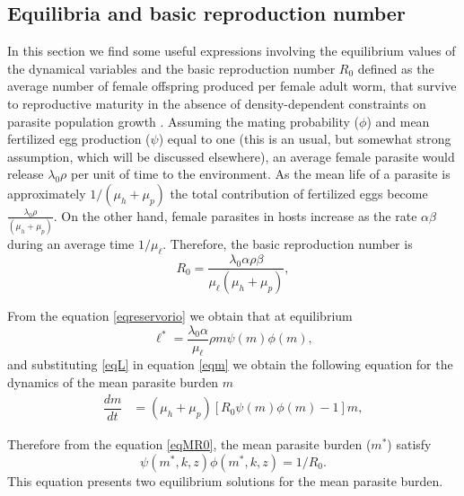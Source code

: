 \documentclass[eng]{MMSB-class-eng}
\begin{document}
{\subsection{Equilibria and basic reproduction number}



{\color{red}
In this section we find some useful expressions involving the equilibrium values of the dynamical variables and the basic reproduction number $R_0$ defined as 
the average number of female offspring produced per female adult worm, that survive to reproductive maturity in the
absence of density-dependent constraints on parasite population growth \citep{anderson1992infectious}. Assuming the mating probability ($\phi$) and mean fertilized egg production ($\psi$) equal to one (this is an usual, but somewhat strong assumption, which will be discussed elsewhere), an average female parasite would release $ \lambda_0  \rho$ per unit of time to the environment. As the mean life of a parasite is approximately $1/(\mu_h+\mu_p)$ the total contribution of fertilized eggs become $\frac{\lambda_0  \rho}{ (\mu_h + \mu_p)}$. On the other hand, female parasites in hosts increase as the rate $\alpha\beta$ during an average time $1/\mu_{\ell}$. Therefore, the basic reproduction number is \citep{anderson1992infectious}
\color{red}
\begin{equation}\label{valorR0}
R_0=\frac{ \lambda_0 \alpha  \rho \beta }{\mu_{\ell} (\mu_h + \mu_p) },
\end{equation}
}

From the equation \eqref{eqreservorio} we obtain that at equilibrium
\begin{equation}\label{eqL}
\ell^*=\frac{ \lambda_0 \alpha}{\mu_{\ell}} \rho  m \psi(m)\phi(m), 
\end{equation} 
and substituting \eqref{eqL} in equation \eqref{eqm} we obtain the following equation for the dynamics of the mean parasite burden $m$
\begin{align}\label{eqMR0}
\dfrac{dm}{dt}&=(\mu_h + \mu_p)\left[ R_0  \psi(m)\phi(m) -1 \right] m,%
\end{align}


Therefore from the equation \eqref{eqMR0}, the mean parasite burden ($m^*$) satisfy
\begin{equation}\label{eqequilibrio}
\psi(m^*,k,z)\phi(m^*,k,z)=1/R_0.
\end{equation}
This equation presents two  equilibrium solutions for the mean parasite burden. 

}
\end{document}
